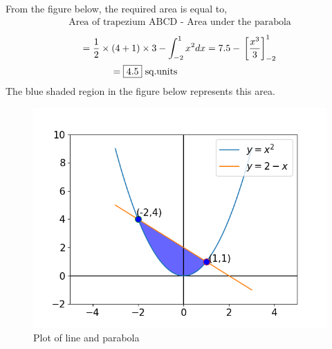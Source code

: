 \documentclass[journal,12pt,twocolumn]{IEEEtran}
\providecommand{\sbrak}[1]{\ensuremath{{}\left[#1\right]}}
\theoremstyle{remark}
\begin{document}
\begin{flushleft}
\vfill\null 
\columnbreak

From the figure below, the required area is equal to,
\begin{align}
    \text{Area of trapezium ABCD - Area under the parabola}
\end{align}
\begin{multline}
    = \frac{1}{2}\times (4 + 1)\times 3 - \int_{-2}^{1} x^2 dx = 7.5 - \sbrak{\frac{x^3}{3}}_{-2}^1 \\
    = \text{\fbox{4.5} sq.units \hspace{2.4cm}}
\end{multline}
The blue shaded region in the figure below represents this area.
\begin{figure}[ht]
    \centering
    \includegraphics[width = \columnwidth]{Figures/Figure.png}
    \caption{Plot of line and parabola}
    \label{Figure}
\end{figure}
\end{flushleft}
\end{document}
